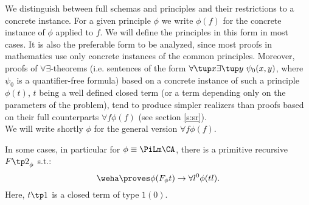 We distinguish between full schemas and principles and their restrictions
to a concrete instance. For a given principle $\phi$ we write  $\phi(f)$ for the
concrete instance of  $\phi $ applied to $f$. We will define the principles
in this form in most cases. It is also the preferable form to be analyzed, since  most
proofs in mathematics use only concrete instances of the common principles. Moreover,
proofs of $\forall\exists$-theorems (i.e. sentences of the form 
$\forall\tup x\exists\tup y\ \psi_0(x,y)$, where $\psi_0$ is a quantifier-free formula) based
on a concrete instance of such a principle $\phi(t)$, $t$ being a well 
defined closed term (or a term depending only on the parameters of
the problem), tend to produce simpler realizers than proofs based
on their full counterparts $\forall f \phi(f)$ (see section \ref{s:sr}).\\
We will write shortly $\phi$ for the general version $\forall f \phi(f)$.\\
\begin{rmk}
In some cases, in particular for $\phi\equiv\PiLm\CA$, there is a 
primitive recursive ${F\tp2}_\phi$ s.t.:
\[
 \weha\proves \phi(F_\phi t)\rightarrow\forall l^0\phi(tl)\text{.}
\]
Here, $t\tp1$ is a closed term of type $1(0)$.
\end{rmk}
%
%
